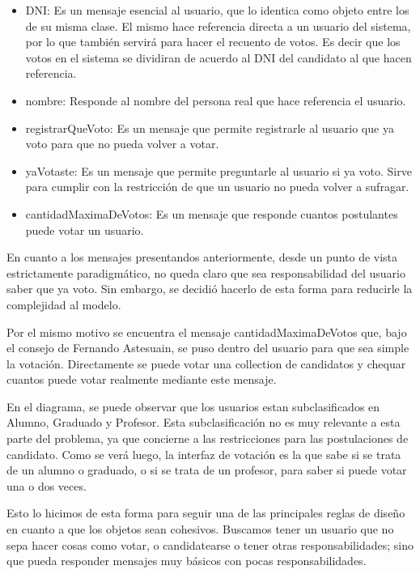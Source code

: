 \begin{itemize}
\item DNI: Es un mensaje esencial al usuario, que lo identica como objeto entre los de su misma clase. El mismo hace referencia directa a un usuario del sistema, por lo que tambi\'en servir\'a para hacer el recuento de votos. Es decir que los votos en el sistema se dividiran de acuerdo al DNI del candidato al que hacen referencia.
\item nombre: Responde al nombre del persona real que hace referencia el usuario.
\item registrarQueVoto: Es un mensaje que permite registrarle al usuario que ya voto para que no pueda volver a votar.
\item yaVotaste: Es un mensaje que permite preguntarle al usuario si ya voto. Sirve para cumplir con la restricci\'on de que un usuario no pueda volver a sufragar.
\item cantidadMaximaDeVotos: Es un mensaje que responde cuantos postulantes puede votar un usuario.
\end{itemize}

En cuanto a los mensajes presentandos anteriormente, desde un punto de vista estrictamente paradigm\'atico, no queda claro que sea responsabilidad del usuario saber que ya voto. Sin embargo, se decidi\'o hacerlo de esta forma para reducirle la complejidad al modelo.

Por el mismo motivo se encuentra el mensaje cantidadMaximaDeVotos que, bajo el consejo de Fernando Astesuain, se puso dentro del usuario para que sea simple la votaci\'on. Directamente se puede votar una collection de candidatos y chequar cuantos puede votar realmente mediante este mensaje.

En el diagrama, se puede observar que los usuarios estan subclasificados en Alumno, Graduado y Profesor. Esta subclasificaci\'on no es muy relevante a esta parte del problema, ya que concierne a las restricciones para las postulaciones de candidato. Como se ver\'a luego, la interfaz de votaci\'on es la que sabe si se trata de un alumno o graduado, o si se trata de un profesor, para saber si puede votar una o dos veces.

Esto lo hicimos de esta forma para seguir una de las principales reglas de diseño en cuanto a que los objetos sean cohesivos. Buscamos tener un usuario que no sepa hacer cosas como votar, o candidatearse o tener otras responsabilidades; sino que pueda responder mensajes muy b\'asicos con pocas responsabilidades.

